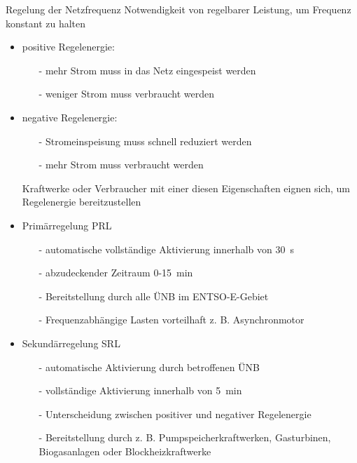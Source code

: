 \documentclass[aspectratio=1610, professionalfonts, 9pt]{beamer}
\begin{document}
\begin{frame}{Regelung der Netzfrequenz}
Notwendigkeit von regelbarer Leistung, um Frequenz konstant zu halten
\begin{itemize}
  \item positive Regelenergie:
  \begin{itemize}
    \item[-] mehr Strom muss in das Netz eingespeist werden
    \item[-] weniger Strom muss verbraucht werden
  \end{itemize}
  \item negative Regelenergie:
  \begin{itemize}
    \item[-] Stromeinspeisung muss schnell reduziert werden
    \item[-] mehr Strom muss verbraucht werden
  \end{itemize}
  \item[\rightarrow] Kraftwerke oder Verbraucher mit einer diesen Eigenschaften eignen sich, um Regelenergie bereitzustellen
\end{itemize}
\end{frame}

\begin{frame}
  \begin{itemize}
    \item Primärregelung PRL
    \begin{itemize}
      \item[-] automatische vollständige Aktivierung innerhalb von \SI{30}{\second}
      \item[-] abzudeckender Zeitraum \num{0}-\SI{15}{\minute}
      \item[-] Bereitstellung durch alle ÜNB im ENTSO-E-Gebiet
      \item[-] Frequenzabhängige Lasten vorteilhaft z. B. Asynchronmotor
    \end{itemize}
    \item Sekundärregelung SRL
    \begin{itemize}
      \item[-] automatische Aktivierung durch betroffenen ÜNB
      \item[-] vollständige Aktivierung innerhalb von \SI{5}{\minute}
      \item[-] Unterscheidung zwischen positiver und negativer Regelenergie
      \item[-] Bereitstellung durch z. B. Pumpspeicherkraftwerken, Gasturbinen, Biogasanlagen oder Blockheizkraftwerke
    \end{itemize}
    \end{itemize}

\end{frame}
\end{document}
